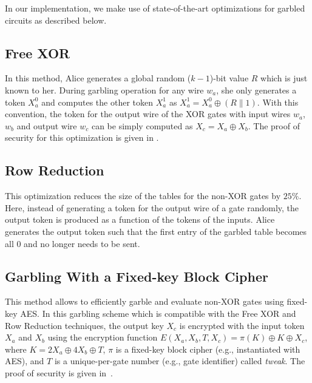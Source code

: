 In our implementation, we make use of state-of-the-art optimizations for garbled circuits as described below.

\subsection{Free XOR~\cite{kolesnikov2008improved}}
In this method, Alice generates a global random ($k-1$)-bit value $R$ which is just known to her.
During garbling operation for any wire $w_a$, she only generates a token $X_a^{0}$ and computes the other token $X_a^{1}$ as $X_a^{1} = X_a^{0} \oplus (R \parallel 1)$.
With this convention, the token for the output wire of the XOR gates with input wires $w_{a}$, $w_{b}$ and output wire $w_{c}$ can be simply computed as $X_{c} = X_{a} \oplus X_{b}$.
The proof of security for this optimization is given in \cite{kolesnikov2008improved}.

\subsection{Row Reduction~\cite{naor1999privacy}}
This optimization reduces the size of the tables for the non-XOR gates by $25\%$.
Here, instead of generating a token for the output wire of a gate randomly, the output token is produced as a function of the tokens of the inputs.
Alice generates the output token such that the first entry of the garbled table becomes all $0$ and no longer needs to be sent.

\subsection{Garbling With a Fixed-key Block Cipher~\cite{bellare2013efficient}}
This method allows to efficiently garble and evaluate non-XOR gates using fixed-key AES.
In this garbling scheme which is compatible with the Free XOR and Row Reduction techniques, the output key $X_{c}$ is encrypted with the input token $X_{a}$ and $X_{b}$ using the encryption function $E(X_a,X_b,T,X_c) = \pi(K) \oplus K \oplus X_c$, where $K=2X_a\oplus4X_b\oplus T$, $\pi$ is a fixed-key block cipher (e.g., instantiated with AES), and $T$ is a unique-per-gate number (e.g., gate identifier) called \emph{tweak}.
The proof of security is given in~\cite{bellare2013efficient}.

